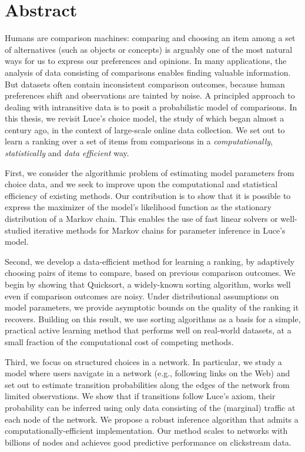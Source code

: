 \cleardoublepage
\chapter*{Abstract}

Humans are comparison machines: comparing and choosing an item among a set of alternatives (such as objects or concepts) is arguably one of the most natural ways for us to express our preferences and opinions.
In many applications, the analysis of data consisting of comparisons enables finding valuable information.
But datasets often contain inconsistent comparison outcomes, because human preferences shift and observations are tainted by noise.
A principled approach to dealing with intransitive data is to posit a probabilistic model of comparisons.
In this thesis, we revisit Luce's choice model, the study of which began almost a century ago, in the context of large-scale online data collection.
We set out to learn a ranking over a set of items from comparisons in a \emph{computationally}, \emph{statistically} and \emph{data efficient} way.

First, we consider the algorithmic problem of estimating model parameters from choice data, and we seek to improve upon the computational and statistical efficiency of existing methods.
Our contribution is to show that it is possible to express the maximizer of the model's likelihood function as the stationary distribution of a Markov chain.
This enables the use of fast linear solvers or well-studied iterative methods for Markov chains for parameter inference in Luce's model.

Second, we develop a data-efficient method for learning a ranking, by adaptively choosing pairs of items to compare, based on previous comparison outcomes.
We begin by showing that Quicksort, a widely-known sorting algorithm, works well even if comparison outcomes are noisy.
Under distributional assumptions on model parameters, we provide asymptotic bounds on the quality of the ranking it recovers.
Building on this result, we use sorting algorithms as a basis for a simple, practical active learning method that performs well on real-world datasets, at a small fraction of the computational cost of competing methods.

Third, we focus on structured choices in a network.
In particular, we study a model where users navigate in a network (e.g., following links on the Web) and set out to estimate transition probabilities along the edges of the network from limited observations.
We show that if transitions follow Luce's axiom, their probability can be inferred using only data consisting of the (marginal) traffic at each node of the network.
We propose a robust inference algorithm that admits a computationally-efficient implementation.
Our method scales to networks with billions of nodes and achieves good predictive performance on clickstream data.

